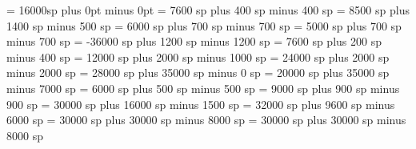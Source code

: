 


\gre@additionallineswidth = 16000sp
\gre@zerowidthspace=0pt plus 0pt minus 0pt
\gre@interglyphspace = 7600 sp plus 400 sp minus 400 sp
\gre@alterationspace = 8500 sp plus 1400 sp minus 500 sp
\gre@clefflatspace = 6000 sp plus 700 sp minus 700 sp
\gre@beforechoralsignspace = 5000 sp plus 700 sp minus 700 sp
\gre@beforealterationspace = -36000 sp plus 1200 sp minus 1200 sp
\gre@interelementspace = 7600 sp plus 200 sp minus 400 sp
\gre@largerspace = 12000 sp plus 2000 sp minus 1000 sp
\gre@glyphspace = 24000 sp plus 2000 sp minus 2000 sp
\gre@intersyllablespace= 28000 sp plus 35000 sp minus 0 sp
\gre@spacebeforecusto = 20000 sp plus 35000 sp minus 7000 sp
\gre@spacebeforesigns= 6000 sp plus 500 sp minus 500 sp
\gre@spaceaftersigns= 9000 sp plus 900 sp minus 900 sp
\gre@spaceafterlineclef = 30000 sp plus 16000 sp minus 1500 sp
\gre@interwordspacenotes = 32000 sp plus 9600 sp minus 6000 sp
\gre@interwordspacenotestext = 30000 sp plus 30000 sp minus 8000 sp
\gre@interwordspacetextnotes = 30000 sp plus 30000 sp minus 8000 sp
